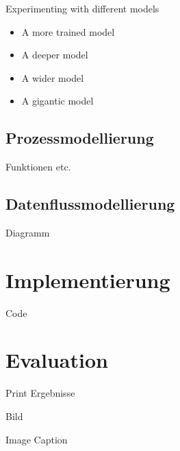 Experimenting with different models

\begin{itemize}
\item A more trained model
\item A deeper model
\item A wider model
\item A gigantic model
\end{itemize}

\subsection{Prozessmodellierung}

Funktionen etc.

\subsection{Datenflussmodellierung}

Diagramm

\section{Implementierung}

Code

\section{Evaluation}

Print Ergebnisse

Bild

Image Caption